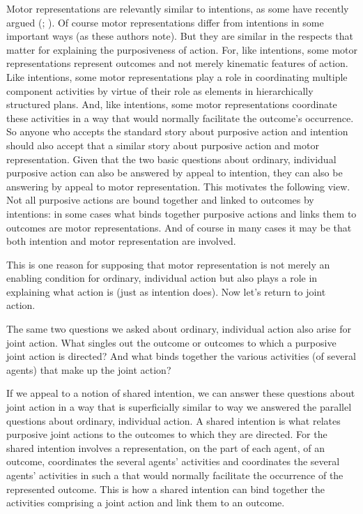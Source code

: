 \documentclass[12pt,\papersize]{extarticle}
\begin{document}
Motor representations are relevantly similar to intentions,
as some have recently argued (\citealp[pp.\ 189-90]{pacherie:2008_action}; \citealp{butterfill:2012_intention}).
Of course motor representations differ from intentions in some important ways (as these authors note).
But they are similar in the respects that matter for explaining the purposiveness of action.
For, like intentions, some motor representations represent outcomes and not merely kinematic features of action.
Like intentions, some motor representations play a role in coordinating multiple  component activities by virtue of their role as elements in hierarchically structured plans.
And, like intentions, some motor representations coordinate these activities in a way that would normally facilitate the outcome’s occurrence.
So anyone who accepts the standard story about purposive action and intention
should also accept that a similar story about purposive action and motor representation.
Given that the two basic questions about ordinary, individual purposive action can also be answered by appeal to intention,
they can also be answering by appeal to motor representation.
This motivates the following view.
Not all purposive actions are bound together and linked to outcomes by intentions: in some cases what binds together purposive actions and links them to outcomes are motor representations.
And of course in many cases it may be that both intention and motor representation are involved.

This is one reason for supposing that motor representation is not merely an enabling condition for ordinary, individual action but also plays a role in explaining what action is (just as intention does).
Now let’s return to joint action.

The same two questions we asked about ordinary, individual action also arise for joint action.
What singles out the outcome or outcomes to which a purposive joint action is directed?
And what binds together the various activities (of several agents) that make up the joint action?

If we appeal to a notion of shared intention,
we can answer these questions about joint action in a way that is superficially similar to way we answered the parallel questions about ordinary, individual action.
A shared intention is what relates purposive joint actions to the outcomes to which they are directed.
For the shared intention 
involves a representation, on the part of each agent, of an outcome,
coordinates the several agents’ activities
and 
coordinates the several agents’ activities in such a that would normally facilitate the occurrence of the represented outcome.
This is how a shared intention can bind together the activities comprising a joint action and link them to an outcome.
\end{document}
